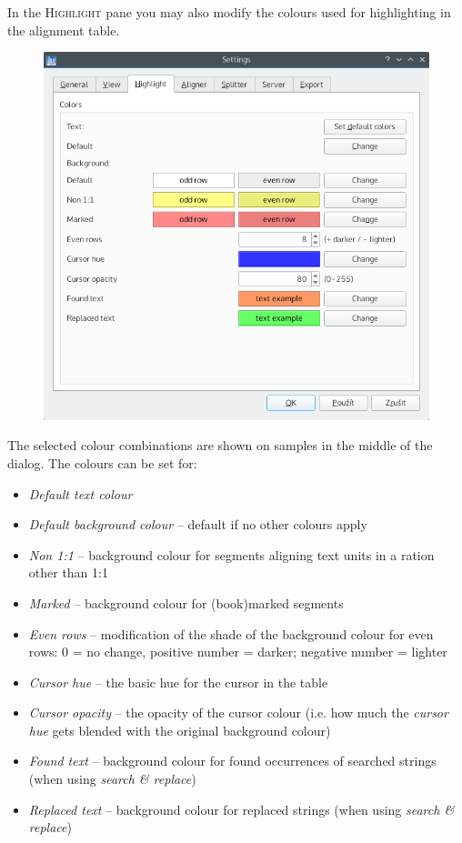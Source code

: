 \documentclass[a4paper,10pt,oneside]{book}
\newcommand{\menu}[1]{\textsc{#1}}
\begin{document}
In the \menu{Highlight} pane you may also modify the colours used for highlighting in the alignment table.

\begin{figure}[htb]
 \includegraphics[width=\textwidth]{screenshots/settings_highlight.png}
\end{figure}

The selected colour combinations are shown on samples in the middle of the dialog. The colours can be set for:

\begin{itemize}
 \item \emph{Default text colour}
 \item \emph{Default background colour} -- default if no other colours apply
 \item \emph{Non 1:1} -- background colour for segments aligning text units in a ration other than 1:1
 \item \emph{Marked} -- background colour for (book)marked segments
 \item \emph{Even rows} -- modification of the shade of the background colour for even rows: 0 = no change, positive number = darker; negative number = lighter
 \item \emph{Cursor hue} -- the basic hue for the cursor in the table
 \item \emph{Cursor opacity} -- the opacity of the cursor colour (i.e. how much the \emph{cursor hue} gets blended with the original background colour)
 \item \emph{Found text} -- background colour for found occurrences of searched strings (when using \emph{search \& replace})
 \item \emph{Replaced text} -- background colour for replaced strings (when using \emph{search \& replace})
\end{itemize}
\end{document}
